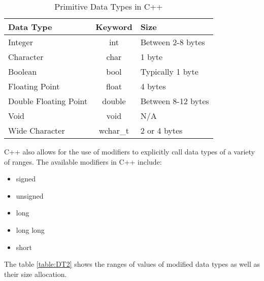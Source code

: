 \documentclass[12pt]{article}
\begin{document}
\begin{table}[h!]
  \begin{center}
    \caption{Primitive Data Types in C++}
    \label{table:DT1}
    \begin{tabular}{|l|c|l|}
      \toprule %
      \textbf{Data Type} & \textbf{Keyword} & \textbf{Size}\\
      \midrule %
      Integer & int & Between 2-8 bytes \\ 
      \hline
      Character & char & 1 byte \\
      \hline
      Boolean & bool & Typically 1 byte \\
      \hline
      Floating Point & float & 4 bytes \\
      \hline
      Double Floating Point & double & Between 8-12 bytes \\
      \hline
      Void & void & N/A \\
      \hline
      Wide Character & wchar\_t & 2 or 4 bytes\\ 
      \bottomrule
    \end{tabular}
  \end{center}
\end{table}

C++ also allows for the use of modifiers to explicitly call data types of a variety of ranges.
The available modifiers in C++ include:
\begin{itemize}
  \item signed
  \item unsigned
  \item long
  \item long long
  \item short
\end{itemize}

The table \ref{table:DT2} shows the ranges of values of modified data types as well as their size allocation.
\end{document}
